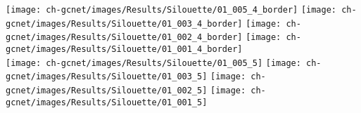 \begin{minipage}[c]{0.46\textwidth} \centering
    \texttt{[image: ch-gcnet/images/Results/Silouette/01\_005\_4\_border]} 
    \texttt{[image: ch-gcnet/images/Results/Silouette/01\_003\_4\_border]} 
    \texttt{[image: ch-gcnet/images/Results/Silouette/01\_002\_4\_border]} 
    \texttt{[image: ch-gcnet/images/Results/Silouette/01\_001\_4\_border]} 
    \\
    \texttt{[image: ch-gcnet/images/Results/Silouette/01\_005\_5]} 
    \texttt{[image: ch-gcnet/images/Results/Silouette/01\_003\_5]} 
    \texttt{[image: ch-gcnet/images/Results/Silouette/01\_002\_5]} 
    \texttt{[image: ch-gcnet/images/Results/Silouette/01\_001\_5]} 
    \\
    \vspace{-0.5em}
    \makebox[0.15\textwidth]{} 
    \\
\end{minipage}
\quad
\begin{minipage}[c]{0.50\textwidth} \centering
{}
\end{minipage}
